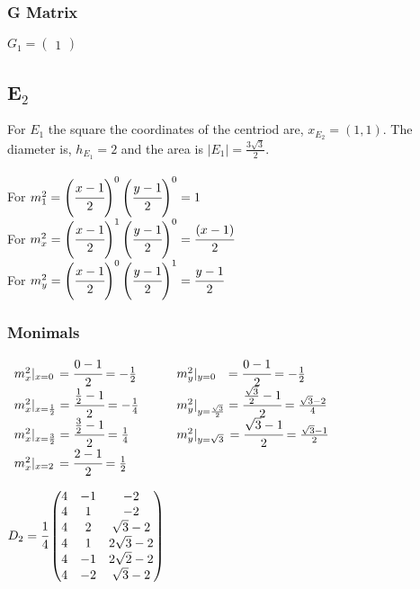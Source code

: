 \documentclass{article}
\begin{document}
\subsubsection{G Matrix}
$G_1 = \begin{pmatrix}
    1
\end{pmatrix}
$

\subsection{E$_2$}
For $E_1$ the square the coordinates of the centriod are, $x_{E_2} = (1,1).$ The diameter is, $ h_{E_1} = 2$ and the area is $|E_1| = \frac{3\sqrt{3}}{2}$.\\
\\
For $m_1^2 = \left(\cfrac{x - 1}{2}\right)^{0}\left(\cfrac{y - 1}{2}\right)^{0} = 1$\\
For $m_x^2 = \left(\cfrac{x - 1}{2}\right)^{1}\left(\cfrac{y - 1}{2}\right)^{0} = \cfrac{(x-1)}{2}$\\
For $m_y^2 = \left(\cfrac{x - 1}{2}\right)^{0}\left(\cfrac{y - 1}{2}\right)^{1} = \cfrac{y-1}{2}$\\

\subsubsection{Monimals}
$\begin{array}{ll}
m_x^2|_{x=0}\hspace{1.5pt} = \cfrac{0-1}{2} = -\frac{1}{2} &\qquad m_y^2|_{y=0} \hspace{7pt}= \cfrac{0-1}{2} = -\frac{1}{2} \\
m_x^2|_{x=\frac{1}{2}} = \cfrac{\frac{1}{2}-1}{2} = -\frac{1}{4} &\qquad m_y^2|_{y=\frac{\sqrt{3}}{2}} = \cfrac{\frac{\sqrt{3}}{2}-1}{2} = \frac{\sqrt{3}-2}{4} \\
m_x^2|_{x=\frac{3}{2}} = \cfrac{\frac{3}{2}-1}{2} = \frac{1}{4} &\qquad m_y^2|_{y=\sqrt{3}}\, = \cfrac{\sqrt{3}-1}{2} = \frac{\sqrt{3}-1}{2} \\
m_x^2|_{x=2}\hspace{1.5pt} = \cfrac{2-1}{2} = \frac{1}{2} &
\end{array}$

$D_2 = \cfrac{1}{4}\begin{pmatrix}
    4 & -1 & - 2\\
    4 & 1 & - 2\\
    4 & 2 & \sqrt{3} - 2\\
    4 & 1 & 2\sqrt{3} - 2\\
    4 & -1 & 2\sqrt{2} - 2\\
    4 & -2 & \sqrt{3} - 2\\
\end{pmatrix}$
\end{document}
